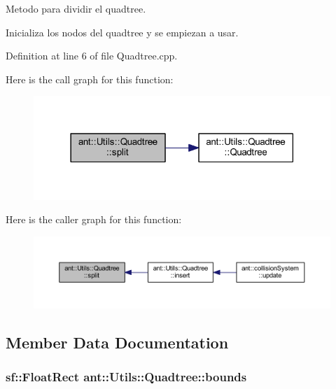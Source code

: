 Metodo para dividir el quadtree. 

Inicializa los nodos del quadtree y se empiezan a usar. 

Definition at line 6 of file Quadtree.\+cpp.



Here is the call graph for this function\+:
\nopagebreak
\begin{figure}[H]
\begin{center}
\leavevmode
\includegraphics[width=318pt]{d6/d94/classant_1_1_utils_1_1_quadtree_abbe98f5025b0127b91c97142237f13db_cgraph}
\end{center}
\end{figure}




Here is the caller graph for this function\+:
\nopagebreak
\begin{figure}[H]
\begin{center}
\leavevmode
\includegraphics[width=350pt]{d6/d94/classant_1_1_utils_1_1_quadtree_abbe98f5025b0127b91c97142237f13db_icgraph}
\end{center}
\end{figure}




\subsection{Member Data Documentation}
\hypertarget{classant_1_1_utils_1_1_quadtree_a1b9aecf327adee874486c11a56ce5334}{
\subsubsection[{bounds}]{\setlength{\rightskip}{0pt plus 5cm}sf\+::\+Float\+Rect ant\+::\+Utils\+::\+Quadtree\+::bounds\hspace{0.3cm}{\ttfamily [private]}}}\label{classant_1_1_utils_1_1_quadtree_a1b9aecf327adee874486c11a56ce5334}


